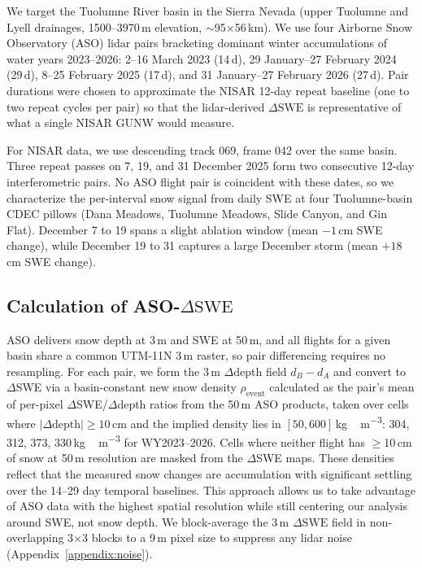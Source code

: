 \documentclass[tc, manuscript]{copernicus}
\begin{document}
We target the Tuolumne River basin in the Sierra Nevada (upper Tuolumne and Lyell drainages, 1500--3970\,\unit{m} elevation, $\sim$95$\times$56\,\unit{km}). We use four Airborne Snow Observatory (ASO) lidar pairs bracketing dominant winter accumulations of water years 2023--2026: 2--16 March 2023 (14\,\unit{d}), 29 January--27 February 2024 (29\,\unit{d}), 8--25 February 2025 (17\,\unit{d}), and 31 January--27 February 2026 (27\,\unit{d}). Pair durations were chosen to approximate the NISAR 12-day repeat baseline (one to two repeat cycles per pair) so that the lidar-derived $\Delta\mathrm{SWE}$ is representative of what a single NISAR GUNW would measure.

For NISAR data, we use descending track 069, frame 042 over the same basin. Three repeat passes on 7, 19, and 31 December 2025 form two consecutive 12-day interferometric pairs. No ASO flight pair is coincident with these dates, so we characterize the per-interval snow signal from daily SWE at four Tuolumne-basin CDEC pillows (Dana Meadows, Tuolumne Meadows, Slide Canyon, and Gin Flat). December 7 to 19 spans a slight ablation window (mean $-1$\,\unit{cm} SWE change), while December 19 to 31 captures a large December storm (mean $+18$\,\unit{cm} SWE change).

\subsection{Calculation of ASO-$\Delta\mathrm{SWE}$}\label{subsec:aso-phase}

ASO delivers snow depth at 3\,\unit{m} and SWE at 50\,\unit{m}, and all flights for a given basin share a common UTM-11N 3\,\unit{m} raster, so pair differencing requires no resampling. For each pair, we form the 3\,\unit{m} $\Delta$depth field $d_B - d_A$ and convert to $\Delta$SWE via a basin-constant new snow density $\rho_\mathrm{event}$ calculated as the pair's mean of per-pixel $\Delta$SWE/$\Delta$depth ratios from the 50\,\unit{m} ASO products, taken over cells where $|\Delta\text{depth}|\geq10$\,\unit{cm} and the implied density lies in $[50, 600]$\,\unit{kg\,m^{-3}}: 304, 312, 373, 330\,\unit{kg\,m^{-3}} for WY2023--2026. Cells where neither flight has $\geq$10\,\unit{cm} of snow at 50\,\unit{m} resolution are masked from the $\Delta$SWE maps. These densities reflect that the measured snow changes are accumulation with significant settling over the 14--29 day temporal baselines. This approach allows us to take advantage of ASO data with the highest spatial resolution while still centering our analysis around SWE, not snow depth. We block-average the 3\,\unit{m} $\Delta\mathrm{SWE}$ field in non-overlapping 3$\times$3 blocks to a 9\,\unit{m} pixel size to suppress any lidar noise (Appendix~\ref{appendix:noise}).
\end{document}
